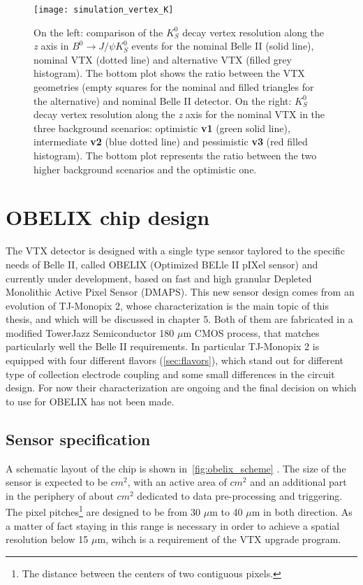 \begin{figure}[h!]
\centering
\texttt{[image: simulation\_vertex\_K]}
\caption{On the left: comparison of the $K_{S}^{0}$ decay vertex resolution along the \textit{z} axis in $B^{0} \rightarrow J/\psi K_{S}^{0}$ events for the nominal Belle II (solid line), nominal VTX (dotted line) and alternative VTX (filled grey histogram). The bottom plot shows the ratio between the VTX geometries (empty squares for the nominal and filled triangles for the alternative) and nominal Belle II detector. 
On the right: $K_{S}^{0}$ decay vertex resolution along the \textit{z} axis for the nominal VTX in the three background scenarios: optimistic \textbf{v1} (green solid line), intermediate \textbf{v2} (blue dotted line) and pessimistic \textbf{v3} (red filled histogram). The bottom plot represents the ratio between the two higher background scenarios and the optimistic one.}
\label{fig:simulation_vertex_K}
\end{figure}


\section{OBELIX chip design}

The VTX detector is designed with a single type sensor taylored to the specific needs of Belle II, called OBELIX (Optimized BELle II pIXel sensor) and currently under development, based on fast and high granular Depleted Monolithic Active Pixel Sensor (DMAPS). This new sensor design comes from an evolution of TJ-Monopix 2, whose characterization is the main topic of this thesis, and which will be discussed in chapter 5. Both of them are fabricated in a modified TowerJazz Semiconductor 180 $\mu$m CMOS process, that matches particularly well the Belle II requirements.
In particular TJ-Monopix 2 is equipped with four different flavors (\autoref{sec:flavors}), which stand out for different type of collection electrode coupling and some small differences in the circuit design. For now their characterization are ongoing and the final decision on which to use for OBELIX has not been made. \\

\subsection{Sensor specification}

A schematic layout of the chip is shown in~\autoref{fig:obelix_scheme} . The size of the sensor is expected to be  $cm^{2}$, with an active area of  $cm^{2}$ and an additional part in the periphery of about  $cm^{2}$ dedicated to data pre-processing and triggering. The pixel pitches\footnote{The distance between the centers of two contiguous pixels.} are designed to be from 30 $\mu$m to 40 $\mu$m in both direction. As a matter of fact staying in this range is necessary in order to achieve a spatial resolution below 15 $\mu$m, wihch is a requirement of the VTX upgrade program.

